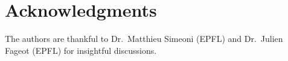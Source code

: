 \section*{Acknowledgments}


The authors are thankful to Dr.\ Matthieu Simeoni (EPFL) and Dr.\ Julien Fageot (EPFL) for insightful discussions.
